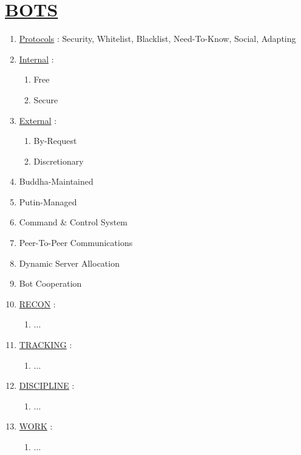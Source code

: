 \documentclass[11pt]{article}
\begin{document}
\section*{\ul{BOTS}}
\begin{enumerate}
	\item[] \ul{Protocols} : Security, Whitelist, Blacklist, Need-To-Know, Social, Adapting

	\item[] \ul{Internal}  :
	\begin{enumerate}
		\item[] Free
		\item[] Secure
	\end{enumerate}
	
	\item[] \ul{External} :
	\begin{enumerate}
		\item[] By-Request
		\item[] Discretionary
	\end{enumerate}

	\item[] Buddha-Maintained
	\item[] Putin-Managed
	\item[] Command \& Control System
	\item[] Peer-To-Peer Communications
	\item[] Dynamic Server Allocation
	\item[] Bot Cooperation

	\item[] \ul{RECON} :
	\begin{enumerate}
		\item[] ...
	\end{enumerate}

	\item[] \ul{TRACKING} :
	\begin{enumerate}
		\item[] ...
	\end{enumerate}

	\item[] \ul{DISCIPLINE} :
	\begin{enumerate}
		\item[] ...
	\end{enumerate}

	\item[] \ul{WORK} :
	\begin{enumerate}
		\item[] ...
	\end{enumerate}


\end{enumerate}
\end{document}
